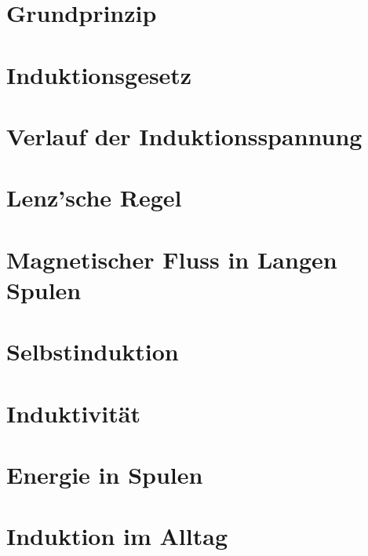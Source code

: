 \section{Grundprinzip}


\section{Induktionsgesetz}


\section{Verlauf der Induktionsspannung}


\section{Lenz'sche Regel}
 			\label{sec:Lenz}

\section[Lange Spulen]{Magnetischer Fluss in Langen Spulen}


\section{Selbstinduktion}		\label{sec:Selbstinduktion}


\section{Induktivität}


\section{Energie in Spulen}		\label{sec:EnergieSpule}


\section{Induktion im Alltag}	\label{sec:Alltag}
